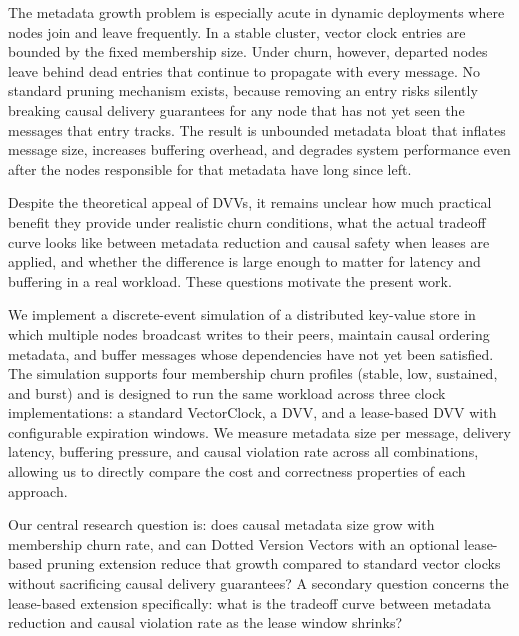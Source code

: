 \documentclass[times, 10pt,twocolumn]{article}
\begin{document}
\vspace{-1em}

\vspace{-1em}

The metadata growth problem is especially acute in dynamic deployments where nodes join and leave frequently. In a stable cluster, vector clock entries are bounded by the fixed membership size. Under churn, however, departed nodes leave behind dead entries that continue to propagate with every message. No standard pruning mechanism exists, because removing an entry risks silently breaking causal delivery guarantees for any node that has not yet seen the messages that entry tracks. The result is unbounded metadata bloat that inflates message size, increases buffering overhead, and degrades system performance even after the nodes responsible for that metadata have long since left.

Despite the theoretical appeal of DVVs, it remains unclear how much practical benefit they provide under realistic churn conditions, what the actual tradeoff curve looks like between metadata reduction and causal safety when leases are applied, and whether the difference is large enough to matter for latency and buffering in a real workload. These questions motivate the present work.

We implement a discrete-event simulation of a distributed key-value store in which multiple nodes broadcast writes to their peers, maintain causal ordering metadata, and buffer messages whose dependencies have not yet been satisfied. The simulation supports four membership churn profiles (stable, low, sustained, and burst) and is designed to run the same workload across three clock implementations: a standard VectorClock, a DVV, and a lease-based DVV with configurable expiration windows. We measure metadata size per message, delivery latency, buffering pressure, and causal violation rate across all combinations, allowing us to directly compare the cost and correctness properties of each approach.

Our central research question is: does causal metadata size grow with membership churn rate, and can Dotted Version Vectors with an optional lease-based pruning extension reduce that growth compared to standard vector clocks without sacrificing causal delivery guarantees? A secondary question concerns the lease-based extension specifically: what is the tradeoff curve between metadata reduction and causal violation rate as the lease window shrinks?
\end{document}
